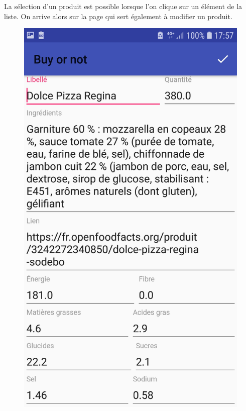 \documentclass[report]{BetterDocument}
\begin{document}
	La sélection d'un produit est possible lorsque l'on clique sur un élément de la liste. On arrive alors sur la page qui sert également à modifier un produit.

	\begin{figure}[H]
		\centering\includegraphics[width=0.5\paperwidth, height=0.3\paperheight, keepaspectratio]{img/consulter.jpg}
	\end{figure}
\end{document}
